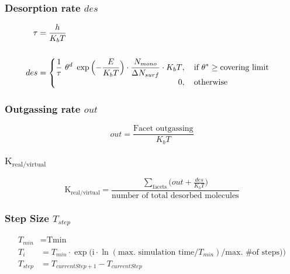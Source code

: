 \subsubsection*{Desorption rate $des$}
\begin{equation}
	\label{eq:des}
	\begin{split}
	\tau&=\frac{h}{K_b T}\\
	&\\
	des&=
	\begin{cases}
		\begin{split}
		\frac{1}{\tau}\ \theta^d\ \exp\Big({-\frac{E}{K_b T}}\Big)\cdot \frac{N_{mono}}{\Delta N_{surf}}\cdot K_b T&, \text{\quad if}\ \theta^* \geq \text{covering limit}\\
		0&,  \text{\quad otherwise}
		\end{split}
	\end{cases}
	\end{split}
\end{equation}

\subsubsection*{Outgassing rate $out$}
\begin{equation}
	\label{eq:out}
	out=\frac{\text{Facet outgassing}}{K_b T}
\end{equation}

\subsubsection*{$\text{K}_{\text{real}/\text{virtual}}$}
\begin{equation}
	\label{eq:krealvirt}
	\text{K}_{\text{real}/\text{virtual}}=\frac{\sum\limits_{\text{facets}}\Big(out + \frac{des}{K_b T}\Big)}{\text{number of total desorbed molecules}}
\end{equation}


\subsubsection*{Step Size $T_{step}$}
\begin{equation}
	\label{eq:tstep}
	\begin{split}
	T_{min}&=\text{Tmin}\\
	T_{i}&=T_{min} \cdot \exp\Big(\text{i}\cdot \ln(\text{max. simulation time}/T_{min})/\text{max. \# of steps})\Big)\\
	T_{step}&=T_{currentStep+1}-T_{currentStep}\\
	\end{split}
\end{equation}

